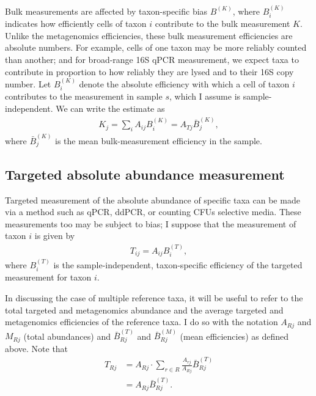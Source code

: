 \documentclass[
]{article}
\theoremstyle{definition}
\theoremstyle{definition}
\theoremstyle{definition}
\theoremstyle{definition}
\theoremstyle{remark}
\begin{document}
Bulk measurements are affected by taxon-specific bias \(B^{(K)}\), where \(B^{(K)}_i\) indicates how efficiently cells of taxon \(i\) contribute to the bulk measurement \(K\).
Unlike the metagenomics efficiencies, these bulk measurement efficiencies are absolute numbers.
For example, cells of one taxon may be more reliably counted than another; and for broad-range 16S qPCR measurement, we expect taxa to contribute in proportion to how reliably they are lysed and to their 16S copy number.
Let \(B^{(K)}_i\) denote the absolute efficiency with which a cell of taxon \(i\) contributes to the measurement in sample \(s\), which I assume is sample-independent.
We can write the estimate as
\begin{align}
  \label{eq:K}
  K_j = \sum_i A_{ij} B^{(K)}_i = A_{Tj} \bar B^{(K)}_j,
\end{align}
where \(\bar B^{(K)}_j\) is the mean bulk-measurement efficiency in the sample.

\hypertarget{targeted-absolute-abundance-measurement}{%
\subsection{Targeted absolute abundance measurement}\label{targeted-absolute-abundance-measurement}}

Targeted measurement of the absolute abundance of specific taxa can be made via a method such as qPCR, ddPCR, or counting CFUs selective media.
These measurements too may be subject to bias;
I suppose that the measurement of taxon \(i\) is given by
\begin{align}
  \label{eq:T}
  T_{ij} = A_{ij} B^{(T)}_i,
\end{align}
where \(B^{(T)}_i\) is the sample-independent, taxon-specific efficiency of the targeted measurement for taxon \(i\).

In discussing the case of multiple reference taxa, it will be useful to refer to the total targeted and metagenomics abundance and the average targeted and metagenomics efficiencies of the reference taxa.
I do so with the notation \(A_{Rj}\) and \(M_{Rj}\) (total abundances) and \(\bar B^{(T)}_{Rj}\) and \(\bar B^{(M)}_{Rj}\) (mean efficiencies) as defined above.
Note that
\begin{align}
  \label{eq:T-Rj}
  T_{Rj} 
    &= A_{Rj} \cdot \sum_{r \in R} \frac{A_{rj}}{A_{Rj}} \bar B^{(T)}_{Rj}
  \\&= A_{Rj} \bar B^{(T)}_{Rj}.
\end{align}
\end{document}
